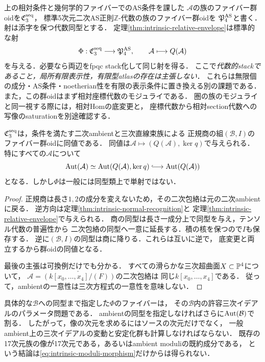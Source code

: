 上の相対条件と幾何学的ファイバーでのAS条件を課した
$\mathcal A$の族のファイバー群oidを$\mathfrak C^{\rm seq}_3$，
標準5次元二次AS正則$\mathbb Z$-代数の族のファイバー群oidを
$\mathfrak P^{\rm AS}_4$と書く．射は添字を保つ代数同型とする．
定理\ref{thm:intrinsic-relative-envelope}は標準的な射
\begin{equation}\label{eq:intrinsic-moduli-morphism}
 \Phi:\mathfrak C^{\rm seq}_3\longrightarrow\mathfrak P^{\rm AS}_4,
 \qquad\mathcal A\longmapsto Q(\mathcal A)
\end{equation}
を与える．必要なら両辺をfpqc stack化して同じ射を得る．
ここで\emph{代数的stackであること，局所有限表示性，有限型atlasの存在は主張しない}．
これらは無限個の成分・AS条件・noetherian性を有限の表示条件に置き換える別の課題である．
また，この群oidはまず相対座標代数のモジュライである．
圏の族のモジュライと同一視する際には，相対Homの底変更と，
座標代数から相対section代数への写像のsaturationを別途確認する．

\begin{proposition}[商データとの同値とambient忘却]
\label{prop:intrinsic-pair-groupoid}
$\mathfrak C^{\rm seq}_3$は，条件を満たす二次ambientと三次直線束族による
正規商の組$(\mathcal B,I)$のファイバー群oidに同値である．
同値は$\mathcal A\mapsto(Q(\mathcal A),\ker q)$で与えられる．
特にすべての$\mathcal A$について
\begin{equation}\label{eq:intrinsic-automorphisms}
 \Aut(\mathcal A)\simeq\Aut(Q(\mathcal A),\ker q)
 \lhook\joinrel\longrightarrow\Aut(Q(\mathcal A))
\end{equation}
となる．しかし$\Phi$は一般には同型類上で単射ではない．
\end{proposition}
\begin{proof}
正規商は長さ$1,2$の成分を変えないため，その二次包絡は元の二次ambientに戻る．
逆方向は定理\ref{thm:intrinsic-normal-recognition}と
定理\ref{thm:intrinsic-relative-envelope}で与えられる．
商の同型は長さ一成分上で同型を与え，テンソル代数の普遍性から
二次包絡の同型へ一意に延長する．積の核を保つので$I$も保存する．
逆に$(\mathcal B,I)$の同型は商に降りる．これらは互いに逆で，
底変更と両立するから群oidの同値となる．

最後の主張は可換例だけでも分かる．
すべての滑らかな三次超曲面$X\subset\mathbb P^4$について，
$\mathcal A=\check{(k[x_0,\ldots,x_4]/(F))}$の二次包絡は
同じ$\check{k[x_0,\ldots,x_4]}$である．
従って，ambientの一意性は三次方程式の一意性を意味しない．
\end{proof}

具体的な$\mathcal B$への同型まで指定した$\Phi$のファイバーは，
その$\mathcal B$内の許容三次イデアルのパラメータ問題である．
ambientの同型を指定しなければさらに$\operatorname{Aut}(\mathcal B)$で割る．
したがって，像の次元を求めるにはソースの次元だけでなく，
一般ambient上の三次イデアルの変動と安定化群も計算しなければならない．
既存の17次元族の像が17次元である，あるいはambient moduliの既約成分である，
という結論は\eqref{eq:intrinsic-moduli-morphism}だけからは得られない．
